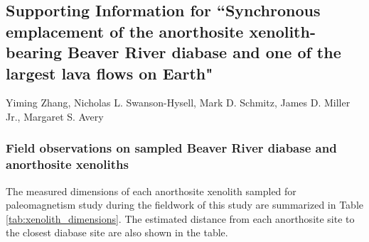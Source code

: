 \documentclass[11pt,letterpaper]{article}
\begin{document}
\renewcommand{\thefigure}{S\arabic{figure}}
\renewcommand{\thetable}{S\arabic{table}}
\subsection*{Supporting Information for ``Synchronous emplacement of the anorthosite xenolith-bearing Beaver River diabase and one of the largest lava flows on Earth"}
Yiming Zhang, Nicholas L. Swanson-Hysell, Mark D. Schmitz, James D. Miller Jr., Margaret S. Avery

\subsubsection*{Field observations on sampled Beaver River diabase and anorthosite xenoliths}

The measured dimensions of each anorthosite xenolith sampled for paleomagnetism study during the fieldwork of this study are summarized in Table \ref{tab:xenolith_dimensions}. The estimated distance from each anorthosite site to the closest diabase site are also shown in the table.
\end{document}
